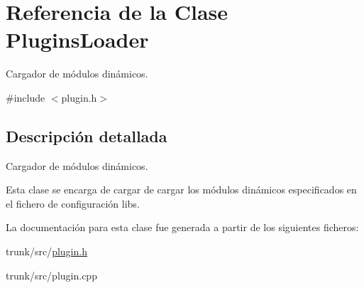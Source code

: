 \hypertarget{classPluginsLoader}{\section{Referencia de la Clase Plugins\-Loader}
\label{classPluginsLoader}
}


Cargador de módulos dinámicos.  




{\ttfamily \#include $<$plugin.\-h$>$}



\subsection{Descripción detallada}
Cargador de módulos dinámicos. 

Esta clase se encarga de cargar de cargar los módulos dinámicos especificados en el fichero de configuración libs. 

La documentación para esta clase fue generada a partir de los siguientes ficheros\-:\begin{DoxyCompactItemize}
\item 
trunk/src/\hyperlink{plugin_8h}{plugin.\-h}\item 
trunk/src/plugin.\-cpp\end{DoxyCompactItemize}

